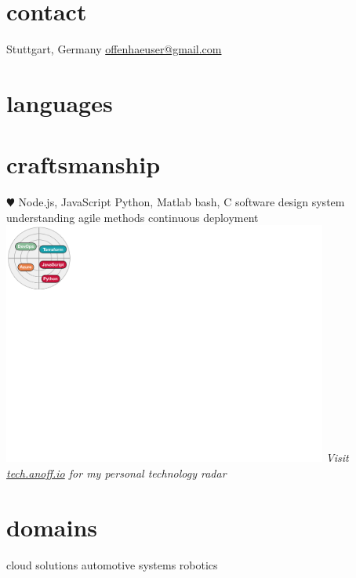 \documentclass[]{friggeri-cv} %
\begin{document}


\begin{aside} %
\section{\color{red}contact}
Stuttgart, Germany
\href{mailto:offenhaeuser@gmail.com}{offenhaeuser@gmail.com}
\section{\color{purple}languages}
\section{\color{green}craftsmanship}
{\color{red} $\varheartsuit$} Node.js, JavaScript
Python, Matlab
bash, C
software design
system understanding
agile methods
continuous deployment
\hfill
\includegraphics[clip, width=0.8\textwidth, trim=0cm 19cm 28cm 0cm]{radar.pdf}
\textit{Visit \href{https://tech.anoff.io}{tech.anoff.io} for my personal technology radar}
\section{\color{blue}domains}
cloud solutions
automotive systems
robotics
\end{aside}
\end{document}
